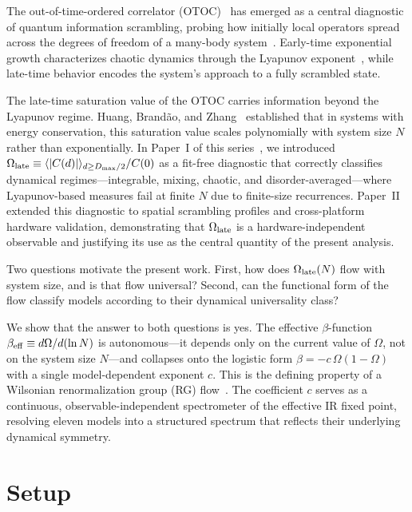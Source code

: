 \documentclass[aps,prl,twocolumn,showpacs,preprintnumbers,superscriptaddress]{revtex4-2}
\begin{document}
The out-of-time-ordered correlator (OTOC)~\cite{Larkin1969,Maldacena2016}
has emerged as a central diagnostic of quantum information scrambling,
probing how initially local operators spread across the degrees of freedom
of a many-body system~\cite{Swingle2018,XuSwingle2024}.
Early-time exponential growth characterizes chaotic dynamics through the
Lyapunov exponent~\cite{Maldacena2016}, while late-time behavior encodes
the system's approach to a fully scrambled state.

The late-time saturation value of the OTOC carries information beyond the
Lyapunov regime.
Huang, Brand\~ao, and Zhang~\cite{HuangFiniteSize2019} established that
in systems with energy conservation, this saturation value scales
polynomially with system size $N$ rather than exponentially.
In Paper~I of this series~\cite{PerezEugenio2026a}, we introduced
$\Omega_{\rm late} \equiv \langle |C(d)| \rangle_{d \geq D_{\rm max}/2}
/ C(0)$ as a fit-free diagnostic that correctly classifies dynamical
regimes---integrable, mixing, chaotic, and disorder-averaged---where
Lyapunov-based measures fail at finite $N$ due to finite-size recurrences.
Paper~II~\cite{PerezEugenio2026b} extended this diagnostic to spatial scrambling
profiles and cross-platform hardware validation, demonstrating that
$\Omega_{\rm late}$ is a hardware-independent observable and justifying
its use as the central quantity of the present analysis.

Two questions motivate the present work.
First, how does $\Omega_{\rm late}(N)$ flow with system size, and is that
flow universal?
Second, can the functional form of the flow classify models according to
their dynamical universality class?

We show that the answer to both questions is yes.
The effective $\beta$-function $\beta_{\rm eff} \equiv d\Omega/d(\ln N)$
is autonomous---it depends only on the current value of $\Omega$, not on
the system size $N$---and collapses onto the logistic form
$\beta = -c\,\Omega(1-\Omega)$ with a single model-dependent exponent $c$.
This is the defining property of a Wilsonian renormalization group (RG)
flow~\cite{Kim2025,Vidal2007,Swingle2012}.
The coefficient $c$ serves as a continuous, observable-independent
spectrometer of the effective IR fixed point, resolving eleven models into
a structured spectrum that reflects their underlying dynamical symmetry.

\section{Setup}
\label{sec:setup}
\end{document}
